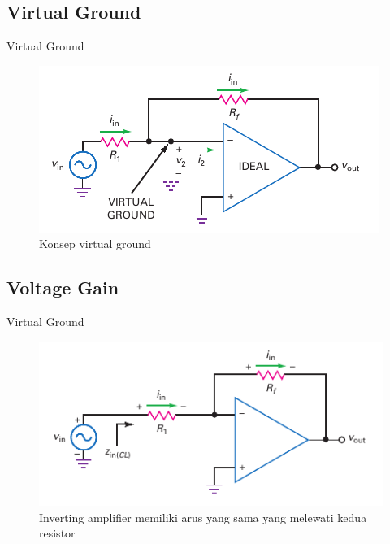 \subsection{Virtual Ground}
\begin{frame}{Virtual Ground}
	\begin{figure}
		\centering
		\includegraphics[height=0.5\textheight]{gambar/fig-16.13}
		\caption{Konsep virtual ground}
		\label{fig-16.13}
	\end{figure}
\end{frame}

\subsection{Voltage Gain}
\begin{frame}{Virtual Ground}
	\begin{figure}
		\centering
		\includegraphics[height=0.5\textheight]{gambar/fig-16.14}
		\caption{Inverting amplifier memiliki arus yang sama yang melewati kedua resistor}
		\label{fig-16.14}
	\end{figure}
\end{frame}

